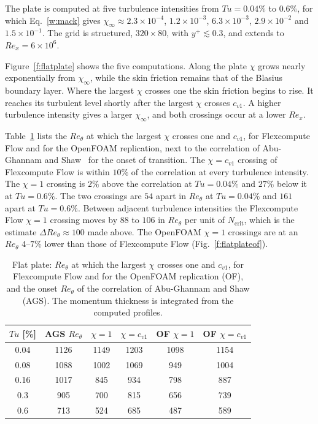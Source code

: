 \documentclass[conf]{new-aiaa}
\begin{document}
The plate is computed at five turbulence intensities from $Tu=0.04\%$ to
$0.6\%$, for which Eq.~\eqref{w:mack} gives $\chi_\infty\approx2.3\times10^{-4}$,
$1.2\times10^{-3}$, $6.3\times10^{-3}$, $2.9\times10^{-2}$ and
$1.5\times10^{-1}$. The grid is structured, $320\times80$, with
$y^+\lesssim0.3$, and extends to $Re_x=6\times10^6$.

Figure~\ref{f:flatplate} shows the five computations. Along the plate $\chi$
grows nearly exponentially from $\chi_\infty$, while the skin friction remains
that of the Blasius boundary layer. Where the largest $\chi$ crosses one the
skin friction begins to rise. It reaches its turbulent level shortly after the
largest $\chi$ crosses $c_{v1}$. A higher turbulence intensity gives a larger
$\chi_\infty$, and both crossings occur at a lower $Re_x$.

Table~\ref{t:flatplate}
lists the $Re_\theta$ at which the largest $\chi$ crosses one and $c_{v1}$,
for Flexcompute Flow and for the OpenFOAM replication, next to the correlation of
Abu-Ghannam and Shaw~\cite{abu_ghannam_shaw_1980} for the onset of transition.
The $\chi=c_{v1}$ crossing of Flexcompute Flow is within $10\%$ of the correlation at
every turbulence intensity. The $\chi=1$ crossing is $2\%$ above the
correlation at $Tu=0.04\%$ and $27\%$ below it at $Tu=0.6\%$. The two
crossings are $54$ apart in $Re_\theta$ at $Tu=0.04\%$ and $161$ apart at
$Tu=0.6\%$. Between adjacent turbulence intensities the Flexcompute Flow $\chi=1$
crossing moves by $88$ to $106$ in $Re_\theta$ per unit of $N_\mathrm{crit}$,
which is the estimate $\Delta Re_\theta\approx100$ made above. The OpenFOAM
$\chi=1$ crossings are at an $Re_\theta$ $4$--$7\%$ lower than those of
Flexcompute Flow (Fig.~\ref{f:flatplateof}).

\begin{table}[!htbp]
  \centering\small
  \caption{Flat plate: $Re_\theta$ at which the largest $\chi$ crosses one and $c_{v1}$, for Flexcompute Flow and for the OpenFOAM replication (OF), and the onset $Re_\theta$ of the correlation of Abu-Ghannam and Shaw (AGS). The momentum thickness is integrated from the computed profiles.}
  \label{t:flatplate}
  \begin{tabular}{cccccc}
    \toprule
    $Tu$ [\%] & AGS $Re_\theta$ & $\chi\!=\!1$ & $\chi\!=\!c_{v1}$ & OF $\chi\!=\!1$ & OF $\chi\!=\!c_{v1}$ \\
    \midrule
    0.04 & 1126 & 1149 & 1203 & 1098 & 1154 \\
    0.08 & 1088 & 1002 & 1069 & 949 & 1004 \\
    0.16 & 1017 & 845 & 934 & 798 & 887 \\
    0.3 & 905 & 700 & 815 & 656 & 739 \\
    0.6 & 713 & 524 & 685 & 487 & 589 \\
    \bottomrule
  \end{tabular}
\end{table}
\end{document}
